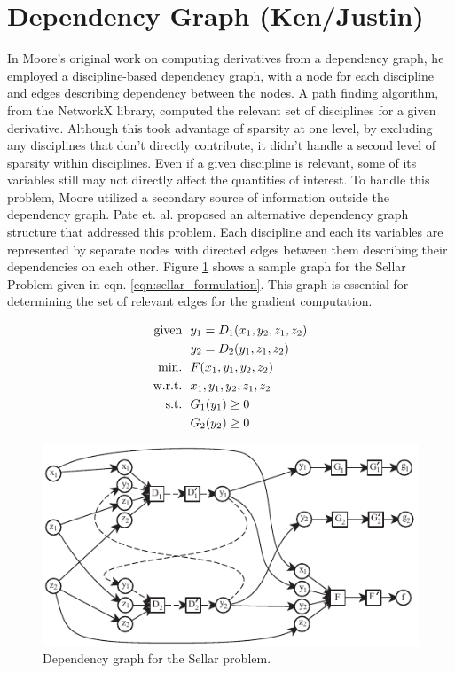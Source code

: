 \documentclass[]{aiaa-tc} %
\newcommand{\txt}{\textrm}
\begin{document}
  \section{Dependency Graph (Ken/Justin)}\label{section:depgraph}

    In Moore's original work on computing derivatives from a dependency graph, he employed
    a discipline-based dependency graph, with a node for each discipline and edges describing
    dependency between the nodes. A path finding algorithm, from the NetworkX library\cite{hagberg-2008-exploring},
    computed the relevant set of disciplines for a given derivative. Although this took advantage of sparsity at
    one level, by excluding any disciplines that don't directly contribute, it didn't handle a second level of sparsity
    within disciplines. Even if a given discipline is relevant, some of its variables still may not 
    directly affect the quantities of interest. To handle this problem, Moore utilized a secondary source of information 
    outside the dependency graph. Pate et. al. proposed an alternative dependency graph
    structure that addressed this problem\cite{graph_problem2013}. Each discipline and each its variables are
    represented by separate nodes with directed edges between them describing their dependencies on each other.
    Figure \ref{fig:sellar_graph} shows a sample graph for the Sellar Problem \cite{AIAA:sellar}
    given in eqn. \ref{eqn:sellar_formulation}. This graph is essential for determining the set of relevant edges 
    for the gradient computation.

    \begin{align}
        \txt{given} & \ \ y_1 = D_1(x_1,y_2,z_1,z_2) \notag
        \\      & \ \ y_2 = D_2(y_1,z_1,z_2) \notag
        \\\txt{min.} &\ \ F(x_1,y_1,y_2,z_2) \notag
        \\\txt{w.r.t.} & \ \ x_1,y_1,y_2,z_1,z_2 \notag
        \\\txt{s.t.} & \ \ G_1(y_1) \geq 0 \notag
        \\     & \ \ G_2(y_2) \geq 0
        \label{eqn:sellar_formulation}
    \end{align}

    \begin{figure}[!htb]\begin{center}
      \includegraphics[width=.8\textwidth]{images/sellar_cycles}
      \caption{ Dependency graph for the Sellar problem. \label{fig:sellar_graph}}
    \end{center}\end{figure}
\end{document}
